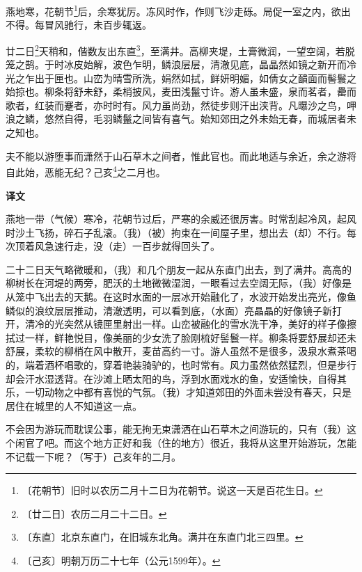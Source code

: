 \documentclass[12pt,UTF-8,openany,a4]{ctexbook}
\begin{document}
\begin{large}
    
    燕地寒，花朝节\footnote{〔花朝节〕\yiwen 旧时以农历二月十二日为花朝节。说这一天是百花生日。}后，余寒犹厉。冻风时作，作则飞沙走砾。局促一室之内，欲出不得。每冒风驰行，未百步辄返。
    
    廿二日\footnote{〔廿二日〕\yiwen 农历二月二十二日。}天稍和，偕数友出东直\footnote{〔东直〕\yiwen 北京东直门，在旧城东北角。满井在东直门北三四里。}，至满井。高柳夹堤，土膏微润，一望空阔，若脱笼之鹄。于时冰皮始解，波色乍明，鳞浪层层，清澈见底，晶晶然如镜之新开而冷光之乍出于匣也。山峦为晴雪所洗，娟然如拭，鲜妍明媚，如倩女之靧面而髻鬟之始掠也。柳条将舒未舒，柔梢披风，麦田浅鬣寸许。游人虽未盛，泉而茗者，罍而歌者，红装而蹇者，亦时时有。风力虽尚劲，然徒步则汗出浃背。凡曝沙之鸟，呷浪之鳞，悠然自得，毛羽鳞鬣之间皆有喜气。始知郊田之外未始无春，而城居者未之知也。
    
    夫不能以游堕事而潇然于山石草木之间者，惟此官也。而此地适与余近，余之游将自此始，恶能无纪？己亥\footnote{〔己亥〕\yiwen 明朝万历二十七年（公元1599年）。}之二月也。
\end{large}


\newpage

\begin{Large}
    \noindent\textbf{译文}
\end{Large}


\vspace{1em}

\begin{large}
    \yiwen 
    燕地一带（气候）寒冷，花朝节过后，严寒的余威还很厉害。时常刮起冷风，起风时沙土飞扬，碎石子乱滚。（我）（被）拘束在一间屋子里，想出去（却）不行。每次顶着风急速行走，没（走）一百步就得回头了。
    
    二十二日天气略微暖和，（我）和几个朋友一起从东直门出去，到了满井。高高的柳树长在河堤的两旁，肥沃的土地微微湿润，一眼看过去空阔无际，（我）好像是从笼中飞出去的天鹅。在这时水面的一层冰开始融化了，水波开始发出亮光，像鱼鳞似的浪纹层层推动，清澈透明，可以看到底，（水面）亮晶晶的好像镜子新打开，清冷的光突然从镜匣里射出一样。山峦被融化的雪水洗干净，美好的样子像擦拭过一样，鲜艳悦目，像美丽的少女洗了脸刚梳好髻鬟一样。柳条将要舒展却还未舒展，柔软的柳梢在风中散开，麦苗高约一寸。游人虽然不是很多，汲泉水煮茶喝的，端着酒杯唱歌的，穿着艳装骑驴的，也时常有。风力虽然依然猛烈，但是步行却会汗水湿透背。在沙滩上晒太阳的鸟，浮到水面戏水的鱼，安适愉快，自得其乐，一切动物之中都有喜悦的气氛。（我）才知道郊田的外面未尝没有春天，只是居住在城里的人不知道这一点。
    
    不会因为游玩而耽误公事，能无拘无束潇洒在山石草木之间游玩的，只有（我）这个闲官了吧。而这个地方正好和我（住的地方）很近，我将从这里开始游玩，怎能不记载一下呢？（写于）己亥年的二月。
    
\end{large}
\end{document}
